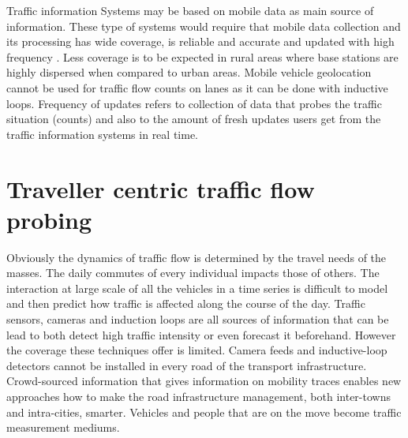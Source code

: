 \documentclass[12pt, a4paper]{report}
\theoremstyle{definition}
\theoremstyle{definition}%
\theoremstyle{definition}%
\theoremstyle{definition}%
\theoremstyle{definition}%
\theoremstyle{definition}%
\begin{document}
Traffic information Systems may be based on mobile data as main source of information. These type of systems would require that mobile data collection and its processing has wide coverage, is reliable and accurate and updated with high frequency \cite{Leduc2008}. Less coverage is to be expected in rural areas where base stations are highly dispersed when compared to urban areas. Mobile vehicle geolocation cannot be used for traffic flow counts on lanes as it can be done with inductive loops. Frequency of updates refers to collection of data that probes the traffic situation (counts) and also to the amount of fresh updates users get from the traffic information systems in real time.

\section{Traveller centric traffic flow probing} \label{section:introduction:traveller_centric_traffic_flow_probing}


Obviously the dynamics of traffic flow is determined by the travel needs of the masses. The daily commutes of every individual impacts those of others. The interaction at large scale of all the vehicles in a time series is difficult to model and then predict how traffic is affected along the course of the day. Traffic sensors, cameras and induction loops are all sources of information that can be lead to both detect high traffic intensity or even forecast it beforehand.  However the coverage these techniques offer is limited. Camera feeds and inductive-loop detectors cannot be installed in every road of the transport infrastructure. Crowd-sourced information that gives information on mobility traces enables new approaches how to make the road infrastructure management, both inter-towns and intra-cities, smarter. Vehicles and people that are on the move become traffic measurement mediums.
\end{document}
